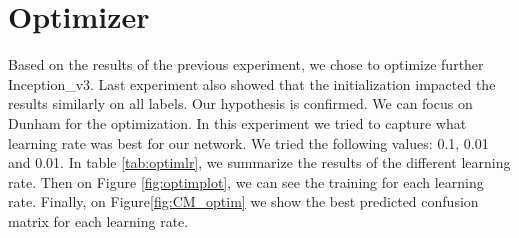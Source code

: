 \section{Optimizer}
Based on the results of the previous experiment, we chose to optimize further Inception\_v3. Last experiment also showed that the initialization impacted the results similarly on all labels. Our hypothesis is confirmed. We can focus on Dunham for the optimization.
In this experiment we tried to capture what learning rate was best for our network. We tried the following values: 0.1, 0.01 and 0.01. In table \ref{tab:optimlr}, we summarize the results of the different learning rate. Then on Figure \ref{fig:optimplot}, we can see the training for each learning rate. Finally, on Figure\ref{fig:CM_optim} we show the best predicted confusion matrix for each learning rate.

